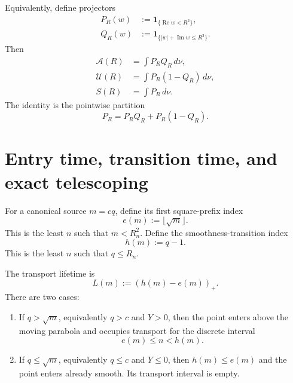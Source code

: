 \documentclass[11pt]{article}
\theoremstyle{definition}
\theoremstyle{remark}
\newcommand{\1}{\mathbf{1}}
\newcommand{\Repart}{\operatorname{Re}}
\newcommand{\Impart}{\operatorname{Im}}
\begin{document}
Equivalently, define projectors
\begin{align}
 P_R(w)&:=\1_{\{\Repart w<R^2\}},
 \label{eq:P-projector}\\
 Q_R(w)&:=\1_{\{|w|+\Impart w\le R^2\}}.
 \label{eq:Q-projector}
\end{align}
Then
\begin{align}
 \mathcal A(R)&=\int P_RQ_R\,d\nu,
 \label{eq:A-projector}\\
 \mathcal U(R)&=\int P_R(1-Q_R)\,d\nu,
 \label{eq:U-projector}\\
 S(R)&=\int P_R\,d\nu.
 \label{eq:S-projector}
\end{align}
The identity is the pointwise partition
\begin{equation}
 P_R=P_RQ_R+P_R(1-Q_R).
 \label{eq:projector-partition}
\end{equation}

\section{Entry time, transition time, and exact telescoping}
\label{sec:telescoping}

For a canonical source $m=cq$, define its first square-prefix index
\begin{equation}
 e(m):=\lfloor\sqrt m\rfloor.
 \label{eq:entry-index}
\end{equation}
This is the least $n$ such that $m<R_n^2$.  Define the smoothness-transition index
\begin{equation}
 h(m):=q-1.
 \label{eq:transition-index}
\end{equation}
This is the least $n$ such that $q\le R_n$.

The transport lifetime is
\begin{equation}
 L(m):=(h(m)-e(m))_+.
 \label{eq:lifetime}
\end{equation}
There are two cases:

\begin{enumerate}[leftmargin=1.7em,itemsep=0.3em]
\item If $q>\sqrt m$, equivalently $q>c$ and $Y>0$, then the point enters above the moving parabola and occupies transport for the discrete interval
\[
 e(m)\le n<h(m).
\]
\item If $q\le\sqrt m$, equivalently $q\le c$ and $Y\le0$, then $h(m)\le e(m)$ and the point enters already smooth.  Its transport interval is empty.
\end{enumerate}
\end{document}
